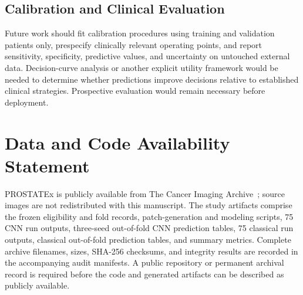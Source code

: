 \documentclass[11pt]{article}
\begin{document}
\subsection{Calibration and Clinical Evaluation}\label{sec:7.3}

Future work should fit calibration procedures using training and validation patients only, prespecify clinically relevant operating points, and report sensitivity, specificity, predictive values, and uncertainty on untouched external data. Decision-curve analysis or another explicit utility framework would be needed to determine whether predictions improve decisions relative to established clinical strategies. Prospective evaluation would remain necessary before deployment.

\section*{Data and Code Availability Statement}

PROSTATEx is publicly available from The Cancer Imaging Archive~\cite{prostatex}; source images are not redistributed with this manuscript. The study artifacts comprise the frozen eligibility and fold records, patch-generation and modeling scripts, 75 CNN run outputs, three-seed out-of-fold CNN prediction tables, 75 classical run outputs, classical out-of-fold prediction tables, and summary metrics. Complete archive filenames, sizes, SHA-256 checksums, and integrity results are recorded in the accompanying audit manifests. A public repository or permanent archival record is required before the code and generated artifacts can be described as publicly available.


\end{document}
